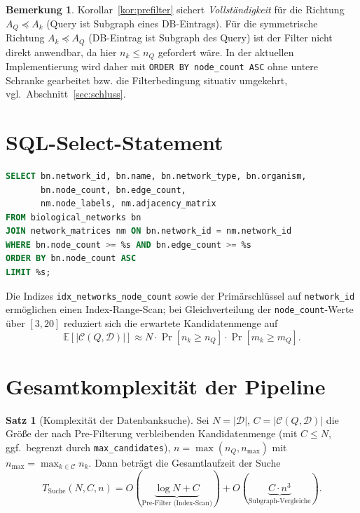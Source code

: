 \documentclass[a4paper,12pt, twoside]{report}
\theoremstyle{definition}
\newtheorem{satz}{Satz}
\newtheorem{bemerkung}{Bemerkung}
\begin{document}
\begin{bemerkung}
	Korollar~\ref{kor:prefilter} sichert \emph{Vollständigkeit} für die Richtung $A_Q \preceq A_k$ (Query ist Subgraph eines DB-Eintrags). Für die symmetrische Richtung $A_k \preceq A_Q$ (DB-Eintrag ist Subgraph des Query) ist der Filter nicht direkt anwendbar, da hier $n_k \le n_Q$ gefordert wäre. In der aktuellen Implementierung wird daher mit \texttt{ORDER BY node\_count ASC} ohne untere Schranke gearbeitet bzw. die Filterbedingung situativ umgekehrt, vgl.\ Abschnitt~\ref{sec:schluss}.
\end{bemerkung}

\section{SQL-Select-Statement}

\begin{lstlisting}[language=SQL, caption=Pre-Filter-Query]
SELECT bn.network_id, bn.name, bn.network_type, bn.organism,
       bn.node_count, bn.edge_count,
       nm.node_labels, nm.adjacency_matrix
FROM biological_networks bn
JOIN network_matrices nm ON bn.network_id = nm.network_id
WHERE bn.node_count >= %s AND bn.edge_count >= %s
ORDER BY bn.node_count ASC
LIMIT %s;
\end{lstlisting}

Die Indizes \texttt{idx\_networks\_node\_count} sowie der Primärschlüssel auf \texttt{network\_id} ermöglichen einen Index-Range-Scan; bei Gleichverteilung der \texttt{node\_count}-Werte über $[3,20]$ reduziert sich die erwartete Kandidatenmenge auf
\[
\mathbb{E}[|\mathcal{C}(Q,\mathcal{D})|] \approx N \cdot \Pr[n_k \ge n_Q] \cdot \Pr[m_k \ge m_Q].
\]

\section{Gesamtkomplexität der Pipeline}

\begin{satz}[Komplexität der Datenbanksuche]
	\label{satz:pipeline}
	Sei $N = |\mathcal{D}|$, $C = |\mathcal{C}(Q,\mathcal{D})|$ die Größe der nach Pre-Filterung verbleibenden Kandidatenmenge (mit $C \le N$, ggf.\ begrenzt durch \texttt{max\_candidates}), $n = \max(n_Q, n_{\max})$ mit $n_{\max} = \max_{k \in \mathcal{C}} n_k$. Dann beträgt die Gesamtlaufzeit der Suche
	\[
	T_{\text{Suche}}(N, C, n) = O(\underbrace{\log N + C}_{\text{Pre-Filter (Index-Scan)}}) + O(\underbrace{C \cdot n^3}_{\text{Subgraph-Vergleiche}}).
	\]
\end{satz}
\end{document}
